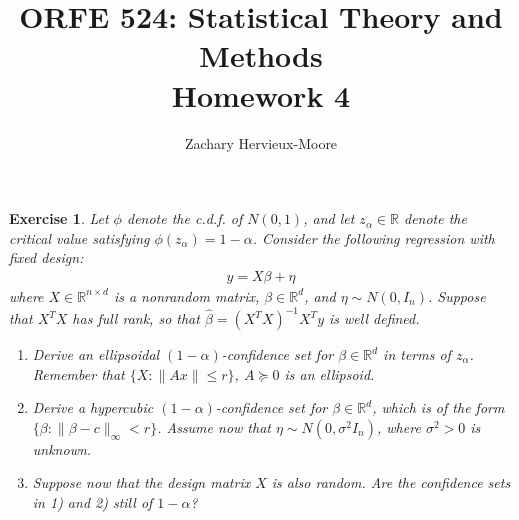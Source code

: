\documentclass[12pt]{article}
\title{ORFE 524: Statistical Theory and Methods \\ Homework 4}
\author{Zachary Hervieux-Moore}
\date{\displaydate{date}}
\theoremstyle{colon}
\newtheorem{exercise}{Exercise}
\begin{document}
\maketitle

\clearpage

\begin{exercise}
  Let $\phi$ denote the c.d.f. of $N(0,1)$, and let $z_\alpha \in \mathbb{R}$ denote the critical value satisfying $\phi(z_\alpha) = 1 - \alpha$. Consider the following regression with fixed design:
  \begin{gather*}
    y = X \beta + \eta
  \end{gather*}
  where $X \in \mathbb{R}^{n \times d}$ is a nonrandom matrix, $\beta \in \mathbb{R}^d$, and $\eta \sim N(0,I_n)$. Suppose that $X^T X$ has full rank, so that $\widehat{\beta} = (X^T X)^{-1} X^T y$ is well defined.
  \begin{enumerate}[label=\arabic*)]
    \item Derive an ellipsoidal $(1-\alpha)$-confidence set for $\beta \in \mathbb{R}^d$ in terms of $z_\alpha$. Remember that $\{ X: \lVert Ax \rVert \leq r \}$, $A \succeq 0$ is an ellipsoid.
    \item Derive a hypercubic $(1-\alpha)$-confidence set for $\beta \in \mathbb{R}^d$, which is of the form $\{ \beta : \lVert \beta - c \rVert_\infty < r \}$. Assume now that $\eta \sim N(0, \sigma^2 I_n)$, where $\sigma^2 > 0$ is unknown.
    \item Suppose now that the design matrix $X$ is also random. Are the confidence sets in 1) and 2) still of $1-\alpha$?
  \end{enumerate}
\end{exercise}
\end{document}
